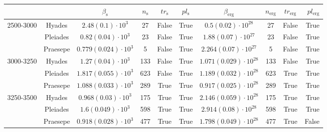 \begin{tabular}{lccccccccr}
\hline
          &         &                     $\beta_\mathrm{s}$ & $n_\mathrm{s}$ & $tr_\mathrm{s}$ & $pl_\mathrm{s}$ &                        $\beta_\mathrm{erg}$ & $n_\mathrm{erg}$ & $tr_\mathrm{erg}$ & $pl_\mathrm{erg}$ \\
\hline
2500-3000 & Hyades &     $2.48\left(0.1\right)\cdot 10^{3}$ &             27 &           False &            True &         $0.5\left(0.02\right)\cdot 10^{28}$ &               27 &             False &              True \\
          & Pleiades &    $0.82\left(0.04\right)\cdot 10^{3}$ &             23 &           False &            True &        $1.88\left(0.07\right)\cdot 10^{27}$ &               23 &             False &              True \\
          & Praesepe &  $0.779\left(0.024\right)\cdot 10^{3}$ &              5 &           False &            True &       $2.264\left(0.07\right)\cdot 10^{27}$ &                5 &             False &              True \\
3000-3250 & Hyades &    $1.27\left(0.04\right)\cdot 10^{3}$ &            133 &           False &            True &      $1.071\left(0.029\right)\cdot 10^{28}$ &              133 &             False &              True \\
          & Pleiades &  $1.817\left(0.055\right)\cdot 10^{3}$ &            623 &           False &            True &      $1.189\left(0.032\right)\cdot 10^{28}$ &              623 &              True &              True \\
          & Praesepe &  $1.088\left(0.033\right)\cdot 10^{3}$ &            289 &            True &            True &      $0.917\left(0.025\right)\cdot 10^{28}$ &              289 &              True &              True \\
3250-3500 & Hyades &   $0.968\left(0.03\right)\cdot 10^{3}$ &            175 &            True &            True &      $2.146\left(0.059\right)\cdot 10^{28}$ &              175 &              True &              True \\
          & Pleiades &    $1.6\left(0.049\right)\cdot 10^{3}$ &            598 &            True &            True &       $2.914\left(0.08\right)\cdot 10^{28}$ &              598 &              True &              True \\
          & Praesepe &  $0.918\left(0.028\right)\cdot 10^{3}$ &            477 &            True &            True &      $1.798\left(0.049\right)\cdot 10^{28}$ &              477 &              True &             False \\

\end{tabular}
